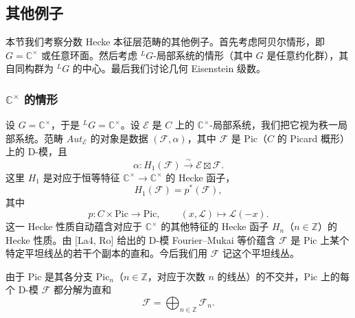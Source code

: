
\subsection{其他例子}

本节我们考察分数 Hecke 本征层范畴的其他例子。首先考虑阿贝尔情形，即 $G = \mathbb{C}^\times$ 或任意环面。然后考虑 ${}^LG$-局部系统的情形（其中 $G$ 是任意约化群），其自同构群为 ${}^LG$ 的中心。最后我们讨论几何 Eisenstein 级数。

\subsubsection{\texorpdfstring{$\mathbb{C}^\times$}{C×} 的情形}

设 $G = \mathbb{C}^\times$，于是 ${}^LG = \mathbb{C}^\times$。设 $\mathcal{E}$ 是 $C$ 上的 $\mathbb{C}^\times$-局部系统，我们把它视为秩一局部系统。范畴 $Aut_{\mathcal{E}}$ 的对象是数据 $(\mathcal{F},\alpha)$，其中 $\mathcal{F}$ 是 $\mathrm{Pic}$（$C$ 的 Picard 概形）上的 D-模，且
\begin{equation}\tag{6.12}
\alpha : H_1(\mathcal{F})\xrightarrow{\sim}\mathcal{E}\boxtimes\mathcal{F}.
\end{equation}
这里 $H_1$ 是对应于恒等特征 $\mathbb{C}^\times\to\mathbb{C}^\times$ 的 Hecke 函子，
\[
H_1(\mathcal{F}) = p^{*}(\mathcal{F}),
\]
其中
\[
p : C\times\mathrm{Pic}\to\mathrm{Pic},\qquad (x,\mathcal{L})\mapsto\mathcal{L}(-x).
\]
这一 Hecke 性质自动蕴含对应于 $\mathbb{C}^\times$ 的其他特征的 Hecke 函子 $H_n$（$n\in\mathbb{Z}$）的 Hecke 性质。由 [La4, Ro] 给出的 D-模 Fourier--Mukai 等价蕴含 $\mathcal{F}$ 是 $\mathrm{Pic}$ 上某个特定平坦线丛的若干个副本的直和。今后我们用 $\mathcal{F}$ 记这个平坦线丛。


由于 $\mathrm{Pic}$ 是其各分支 $\mathrm{Pic}_n$（$n\in\mathbb{Z}$，对应于次数 $n$ 的线丛）的不交并，$\mathrm{Pic}$ 上的每个 D-模 $\mathcal{F}$ 都分解为直和
\begin{equation}\tag{6.13}
\mathcal{F} = \bigoplus_{n\in\mathbb{Z}}\mathcal{F}_n.
\end{equation}

